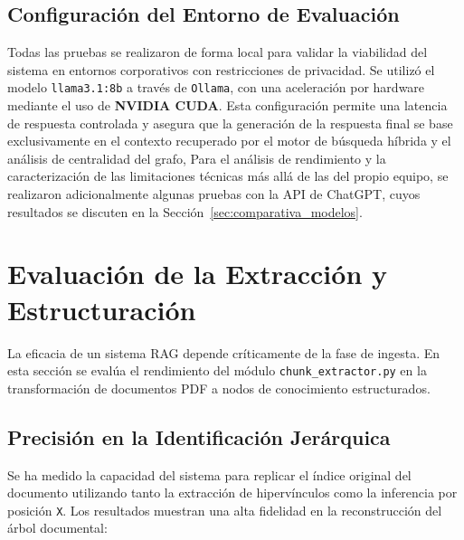 \subsection{Configuración del Entorno de Evaluación}
Todas las pruebas se realizaron de forma local para validar la viabilidad del sistema en entornos corporativos con restricciones de privacidad. Se utilizó el modelo \texttt{llama3.1:8b} a través de \texttt{Ollama}, con una aceleración por hardware mediante el uso de \textbf{NVIDIA CUDA}. Esta configuración permite una latencia de respuesta controlada y asegura que la generación de la respuesta final se base exclusivamente en el contexto recuperado por el motor de búsqueda híbrida y el análisis de centralidad del grafo, Para el análisis de rendimiento y la caracterización de las limitaciones técnicas más allá de las del propio equipo, se realizaron adicionalmente algunas pruebas con la API de ChatGPT, cuyos resultados se discuten en la Sección~\ref{sec:comparativa_modelos}.

\newpage

\section{Evaluación de la Extracción y Estructuración}

La eficacia de un sistema RAG depende críticamente de la fase de ingesta. En esta sección se evalúa el rendimiento del módulo \texttt{chunk\_extractor.py} en la transformación de documentos PDF a nodos de conocimiento estructurados.

\subsection{Precisión en la Identificación Jerárquica}
Se ha medido la capacidad del sistema para replicar el índice original del documento utilizando tanto la extracción de hipervínculos como la inferencia por posición \texttt{X}. Los resultados muestran una alta fidelidad en la reconstrucción del árbol documental:

